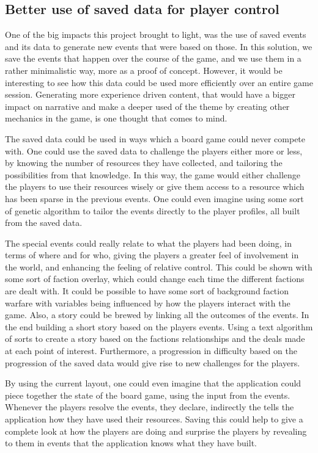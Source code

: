 \subsection{Better use of saved data for player control}
\label{sec:savdat}
One of the big impacts this project brought to light, was the use of saved events and its data to generate new events that were based on those. In this solution, we save the events that happen over the course of the game, and we use them in a rather minimalistic way, more as a proof of concept. However, it would be interesting to see how this data could be used more efficiently over an entire game session. Generating more experience driven content, that would have a bigger impact on narrative and make a deeper used of the theme by creating other mechanics in the game, is one thought that comes to mind. 

The saved data could be used in ways which a board game could never compete with. One could use the saved data to challenge the players either more or less, by knowing the number of resources they have collected, and tailoring the possibilities from that knowledge. In this way, the game would either challenge the players to use their resources wisely or give them access to a resource which has been sparse in the previous events. One could even imagine using some sort of genetic algorithm to tailor the events directly to the player profiles, all built from the saved data.

The special events could really relate to what the players had been doing, in terms of where and for who, giving the players a greater feel of involvement in the world, and enhancing the feeling of relative control. This could be shown with some sort of faction overlay, which could change each time the different factions are dealt with. It could be possible to have some sort of background faction warfare with variables being influenced by how the players interact with the game. Also, a story could be brewed by linking all the outcomes of the events. In the end building a short story based on the players events. Using a text algorithm of sorts to create a story based on the factions relationships and the deals made at each point of interest. Furthermore, a progression in difficulty based on the progression of the saved data would give rise to new challenges for the players.

By using the current layout, one could even imagine that the application could piece together the state of the board game, using the input from the events. Whenever the players resolve the events, they declare, indirectly the tells the application how they have used their resources. Saving this could help to give a complete look at how the players are doing and surprise the players by revealing to them in events that the application knows what they have built.

